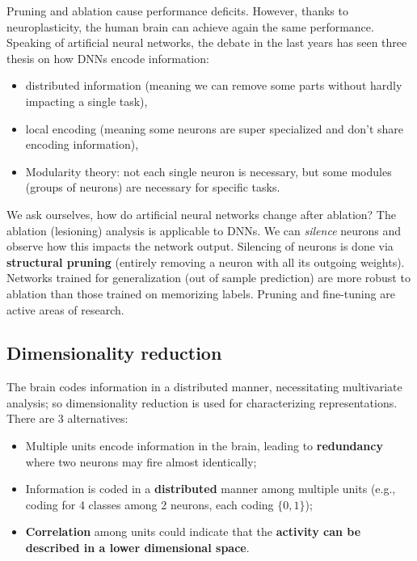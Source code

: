 Pruning and ablation cause performance deficits. However, thanks to neuroplasticity, the human brain can achieve again the same performance.\\

Speaking of artificial neural networks, the debate in the last years has seen three thesis on how DNNs encode information:
\begin{itemize}
    \item distributed information (meaning we can remove some parts without hardly impacting a single task),
    \item local encoding (meaning some neurons are super specialized and don't share encoding information),
    \item Modularity theory: not each single neuron is necessary, but some modules (groups of neurons) are necessary for specific tasks.
\end{itemize}

We ask ourselves, how do artificial neural networks change after ablation?
The ablation (lesioning) analysis is applicable to DNNs. We can \textit{silence} neurons and observe how this impacts the network output. Silencing of neurons is done via \textbf{structural pruning} (entirely removing a neuron with all its outgoing weights).
Networks trained for generalization (out of sample prediction) are more robust to ablation than those trained on memorizing labels. 
Pruning and fine-tuning are active areas of research.

\subsection{Dimensionality reduction}
The brain codes information in a distributed manner, necessitating multivariate analysis; so dimensionality reduction is used for characterizing representations. There are 3 alternatives:
\begin{itemize}
    \item Multiple units encode information in the brain, leading to \textbf{redundancy} where two neurons may fire almost identically;
    \item Information is coded in a \textbf{distributed} manner among multiple units (e.g., coding for 4 classes among 2 neurons, each coding $\{0,1\}$);
    \item \textbf{Correlation} among units could indicate that the \textbf{activity can be described in a lower dimensional space}.
\end{itemize}

